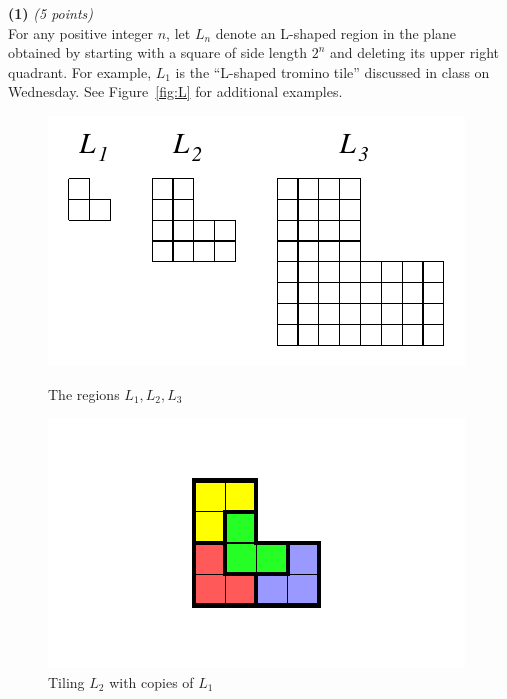\documentclass[12pt]{article}
\begin{document}
\setlength{\parindent}{0in}
\addtolength{\parskip}{0.1cm}
\setlength{\fboxrule}{.5mm}\setlength{\fboxsep}{1.2mm}
\newlength{\boxlength}\setlength{\boxlength}{\textwidth}
\addtolength{\boxlength}{-4mm}
\begin{center}
\end{center}
\vspace{5mm}

{\bf (1)} {\em (5 points)}\\
For any positive integer $n$, let $L_n$ denote
an L-shaped region in the plane obtained by starting
with a square of side length $2^n$ and deleting its 
upper right quadrant. For example, $L_1$ is the
``L-shaped tromino tile'' discussed in class on Wednesday.
See Figure~\ref{fig:L} for additional examples.
\begin{figure}[h]
  \centering
  \begin{minipage}{0.45\textwidth}
    \centering
    \includegraphics[width=\textwidth]{figl}
    \caption{The regions $L_1,L_2,L_3$}
    \label{fig:L}
  \end{minipage}
  \hfill
  \begin{minipage}{0.45\textwidth}
    \centering
    \includegraphics[width=\textwidth]{l2tile}
    \caption{Tiling $L_2$ with copies of $L_1$}
    \label{fig:l2tile}
  \end{minipage}
\end{figure}
\end{document}
